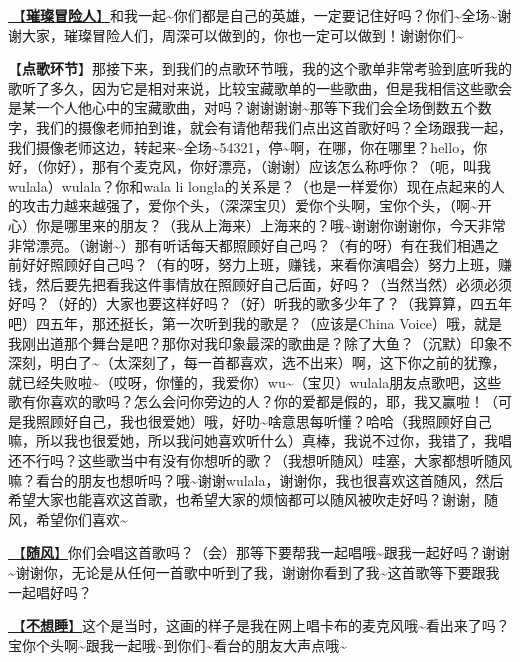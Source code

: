\documentclass[]{ctexbook}
\begin{document}
\hyperref[adventurers]{🎵【\textbf{璀璨冒险人}】}和我一起\textasciitilde 你们都是自己的英雄，一定要记住好吗？你们\textasciitilde 全场\textasciitilde 谢谢大家，璀璨冒险人们，周深可以做到的，你也一定可以做到！谢谢你们\textasciitilde{}

【\textbf{点歌环节}】那接下来，到我们的点歌环节哦，我的这个歌单非常考验到底听我的歌听了多久，因为它是相对来说，比较宝藏歌单的一些歌曲，但是我相信这些歌会是某一个人他心中的宝藏歌曲，对吗？谢谢谢谢\textasciitilde 那等下我们会全场倒数五个数字，我们的摄像老师拍到谁，就会有请他帮我们点出这首歌好吗？全场跟我一起，我们摄像老师这边，转起来\textasciitilde 全场\textasciitilde54321，停\textasciitilde 啊，在哪，你在哪里？hello，你好，（你好），那有个麦克风，你好漂亮，（谢谢）应该怎么称呼你？（呃，叫我wulala）wulala？你和wala li longla的关系是？（也是一样爱你）现在点起来的人的攻击力越来越强了，爱你个头，（深深宝贝）爱你个头啊，宝你个头，（啊\textasciitilde 开心）你是哪里来的朋友？（我从上海来）上海来的？哦\textasciitilde 谢谢你谢谢你，今天非常非常漂亮。（谢谢\textasciitilde）那有听话每天都照顾好自己吗？（有的呀）有在我们相遇之前好好照顾好自己吗？（有的呀，努力上班，赚钱，来看你演唱会）努力上班，赚钱，然后要先把看我这件事情放在照顾好自己后面，好吗？（当然当然）必须必须好吗？（好的）大家也要这样好吗？（好）听我的歌多少年了？（我算算，四五年吧）四五年，那还挺长，第一次听到我的歌是？（应该是China Voice）哦，就是我刚出道那个舞台是吧？那你对我印象最深的歌曲是？除了大鱼？（沉默）印象不深刻，明白了\textasciitilde（太深刻了，每一首都喜欢，选不出来）啊，这下你之前的犹豫，就已经失败啦\textasciitilde（哎呀，你懂的，我爱你）wu\textasciitilde（宝贝）wulala朋友点歌吧，这些歌有你喜欢的歌吗？怎么会问你旁边的人？你的爱都是假的，耶，我又赢啦！（可是我照顾好自己，我也很爱她）哦，好叻\textasciitilde 啥意思每听懂？哈哈（我照顾好自己嘛，所以我也很爱她，所以我问她喜欢听什么）真棒，我说不过你，我错了，我唱还不行吗？这些歌当中有没有你想听的歌？（我想听随风）哇塞，大家都想听随风嘛？看台的朋友也想听吗？哦\textasciitilde 谢谢wulala，谢谢你，我也很喜欢这首随风，然后希望大家也能喜欢这首歌，也希望大家的烦恼都可以随风被吹走好吗？谢谢，随风，希望你们喜欢\textasciitilde{}

\hyperref[with-wind]{🎵【\textbf{随风}】}你们会唱这首歌吗？（会）那等下要帮我一起唱哦\textasciitilde 跟我一起好吗？谢谢\textasciitilde 谢谢你，无论是从任何一首歌中听到了我，谢谢你看到了我\textasciitilde 这首歌等下要跟我一起唱好吗？

\hyperref[keep-playing]{🎵【\textbf{不想睡}】}这个是当时，这画的样子是我在网上唱卡布的麦克风哦\textasciitilde 看出来了吗？宝你个头啊\textasciitilde 跟我一起哦\textasciitilde 到你们\textasciitilde 看台的朋友大声点哦\textasciitilde{}
\end{document}
